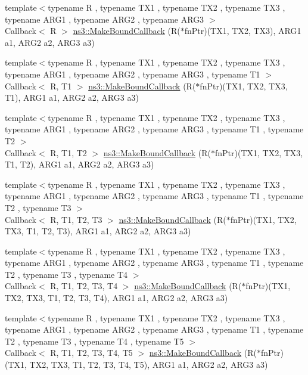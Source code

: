 \begin{DoxyCompactItemize}
\item 
{\footnotesize template$<$typename R , typename T\+X1 , typename T\+X2 , typename T\+X3 , typename A\+R\+G1 , typename A\+R\+G2 , typename A\+R\+G3 $>$ }\\Callback$<$ R $>$ \hyperlink{group__makeboundcallback_ga8e8bbefede216b1bf34171c9278536f2}{ns3\+::\+Make\+Bound\+Callback} (R($\ast$fn\+Ptr)(T\+X1, T\+X2, T\+X3), A\+R\+G1 a1, A\+R\+G2 a2, A\+R\+G3 a3)
\item 
{\footnotesize template$<$typename R , typename T\+X1 , typename T\+X2 , typename T\+X3 , typename A\+R\+G1 , typename A\+R\+G2 , typename A\+R\+G3 , typename T1 $>$ }\\Callback$<$ R, T1 $>$ \hyperlink{group__makeboundcallback_gaff75cd571baec5f3803f73ff198fa9ae}{ns3\+::\+Make\+Bound\+Callback} (R($\ast$fn\+Ptr)(T\+X1, T\+X2, T\+X3, T1), A\+R\+G1 a1, A\+R\+G2 a2, A\+R\+G3 a3)
\item 
{\footnotesize template$<$typename R , typename T\+X1 , typename T\+X2 , typename T\+X3 , typename A\+R\+G1 , typename A\+R\+G2 , typename A\+R\+G3 , typename T1 , typename T2 $>$ }\\Callback$<$ R, T1, T2 $>$ \hyperlink{group__makeboundcallback_ga38d91e0b4ceb25584aa217675dd0551b}{ns3\+::\+Make\+Bound\+Callback} (R($\ast$fn\+Ptr)(T\+X1, T\+X2, T\+X3, T1, T2), A\+R\+G1 a1, A\+R\+G2 a2, A\+R\+G3 a3)
\item 
{\footnotesize template$<$typename R , typename T\+X1 , typename T\+X2 , typename T\+X3 , typename A\+R\+G1 , typename A\+R\+G2 , typename A\+R\+G3 , typename T1 , typename T2 , typename T3 $>$ }\\Callback$<$ R, T1, T2, T3 $>$ \hyperlink{group__makeboundcallback_ga5d8966aa1c8f519e117279abb1aed24c}{ns3\+::\+Make\+Bound\+Callback} (R($\ast$fn\+Ptr)(T\+X1, T\+X2, T\+X3, T1, T2, T3), A\+R\+G1 a1, A\+R\+G2 a2, A\+R\+G3 a3)
\item 
{\footnotesize template$<$typename R , typename T\+X1 , typename T\+X2 , typename T\+X3 , typename A\+R\+G1 , typename A\+R\+G2 , typename A\+R\+G3 , typename T1 , typename T2 , typename T3 , typename T4 $>$ }\\Callback$<$ R, T1, T2, T3, T4 $>$ \hyperlink{group__makeboundcallback_ga8a8d057e868a35fe9ef8f21f9df0af58}{ns3\+::\+Make\+Bound\+Callback} (R($\ast$fn\+Ptr)(T\+X1, T\+X2, T\+X3, T1, T2, T3, T4), A\+R\+G1 a1, A\+R\+G2 a2, A\+R\+G3 a3)
\item 
{\footnotesize template$<$typename R , typename T\+X1 , typename T\+X2 , typename T\+X3 , typename A\+R\+G1 , typename A\+R\+G2 , typename A\+R\+G3 , typename T1 , typename T2 , typename T3 , typename T4 , typename T5 $>$ }\\Callback$<$ R, T1, T2, T3, T4, T5 $>$ \hyperlink{group__makeboundcallback_ga33638446c6f06f30eec9903f6720cbad}{ns3\+::\+Make\+Bound\+Callback} (R($\ast$fn\+Ptr)(T\+X1, T\+X2, T\+X3, T1, T2, T3, T4, T5), A\+R\+G1 a1, A\+R\+G2 a2, A\+R\+G3 a3)

\end{DoxyCompactItemize}
